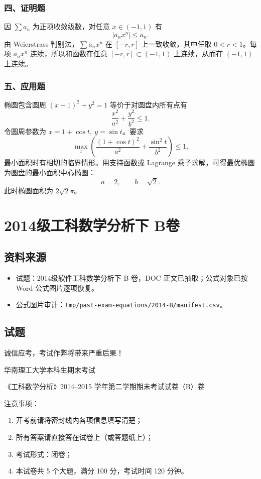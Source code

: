 \subsubsection*{四、证明题}
因 $\sum a_n$ 为正项收敛级数，对任意 $x\in(-1,1)$ 有
\[
|a_nx^n|\le a_n.
\]
由 Weierstrass 判别法，$\sum a_nx^n$ 在 $[-r,r]$ 上一致收敛，其中任取 $0<r<1$。每项 $a_nx^n$ 连续，所以和函数在任意 $[-r,r]\subset(-1,1)$ 上连续，从而在 $(-1,1)$ 上连续。

\subsubsection*{五、应用题}
椭圆包含圆周 $(x-1)^2+y^2=1$ 等价于对圆盘内所有点有
\[
\frac{x^2}{a^2}+\frac{y^2}{b^2}\le1.
\]
令圆周参数为 $x=1+\cos t,\ y=\sin t$。要求
\[
\max_t\left(\frac{(1+\cos t)^2}{a^2}+\frac{\sin^2t}{b^2}\right)\le1.
\]
最小面积时有相切的临界情形。用支持函数或 Lagrange 乘子求解，可得最优椭圆为圆盘的最小面积中心椭圆：
\[
a=2,\qquad b=\sqrt2.
\]
此时椭圆面积为 $2\sqrt2\pi$。

\section{2014级工科数学分析下 B卷}

\subsection{资料来源}
\begin{itemize}
  \item 试题：2014级软件工科数学分析下 B 卷，DOC 正文已抽取；公式对象已按 Word 公式图片逐项恢复。
  \item 公式图片审计：\texttt{tmp/past-exam-equations/2014-B/manifest.csv}。
\end{itemize}

\subsection{试题}
诚信应考，考试作弊将带来严重后果！

华南理工大学本科生期末考试

《工科数学分析》2014--2015 学年第二学期期末考试试卷（B）卷

注意事项：
\begin{enumerate}
  \item 开考前请将密封线内各项信息填写清楚；
  \item 所有答案请直接答在试卷上（或答题纸上）；
  \item 考试形式：闭卷；
  \item 本试卷共 5 个大题，满分 100 分，考试时间 120 分钟。
\end{enumerate}

